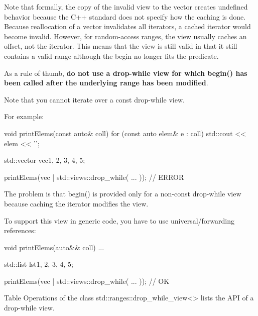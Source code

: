 Note that formally, the copy of the invalid view to the vector creates undefined behavior because the C++ standard does not specify how the caching is done. Because reallocation of a vector invalidates all iterators, a cached iterator would become invalid. However, for random-access ranges, the view usually caches an offset, not the iterator. This means that the view is still valid in that it still contains a valid range although the begin no longer fits the predicate.

As a rule of thumb, \textbf{do not use a drop-while view for which begin() has been called after the underlying range has been modified}.


Note that you cannot iterate over a const drop-while view.

For example:

\begin{cpp}
void printElems(const auto& coll) {
	for (const auto elem& e : coll) {
		std::cout << elem << '\n';
	}
}

std::vector vec{1, 2, 3, 4, 5};

printElems(vec | std::views::drop_while( ... )); // ERROR
\end{cpp}

The problem is that begin() is provided only for a non-const drop-while view because caching the iterator modifies the view.

To support this view in generic code, you have to use universal/forwarding references:

\begin{cpp}
void printElems(auto&& coll) {
	...
}

std::list lst{1, 2, 3, 4, 5};

printElems(vec | std::views::drop_while( ... )); // OK
\end{cpp}


Table Operations of the class std::ranges::drop\_while\_view<> lists the API of a drop-while view.

